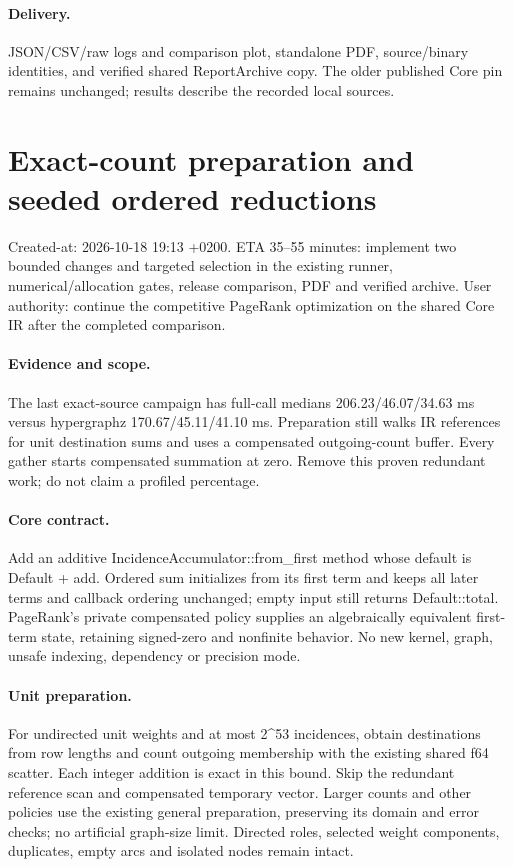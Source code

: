 \documentclass[11pt]{article}
\begin{document}
\paragraph{Delivery.} JSON/CSV/raw logs and comparison plot, standalone PDF,
source/binary identities, and verified shared ReportArchive copy. The older
published Core pin remains unchanged; results describe the recorded local sources.


\newpage\section*{Exact-count preparation and seeded ordered reductions}
Created-at: 2026-10-18 19:13 +0200. ETA 35--55 minutes: implement two bounded changes and targeted
selection in the existing runner, numerical/allocation gates, release comparison,
PDF and verified archive. User authority: continue the competitive PageRank
optimization on the shared Core IR after the completed comparison.
\paragraph{Evidence and scope.} The last exact-source campaign has full-call
medians 206.23/46.07/34.63 ms versus hypergraphz 170.67/45.11/41.10 ms.
Preparation still walks IR references for unit destination sums and uses a
compensated outgoing-count buffer. Every gather starts compensated summation at
zero. Remove this proven redundant work; do not claim a profiled percentage.
\paragraph{Core contract.} Add an additive IncidenceAccumulator::from\_first
method whose default is Default + add. Ordered sum initializes from its first
term and keeps all later terms and callback ordering unchanged; empty input
still returns Default::total. PageRank's private compensated policy supplies an
algebraically equivalent first-term state, retaining signed-zero and nonfinite
behavior. No new kernel, graph, unsafe indexing, dependency or precision mode.
\paragraph{Unit preparation.} For undirected unit weights and at most 2\^{}53
incidences, obtain destinations from row lengths and count outgoing membership
with the existing shared f64 scatter. Each integer addition is exact in this
bound. Skip the redundant reference scan and compensated temporary vector.
Larger counts and other policies use the existing general preparation, preserving
its domain and error checks; no artificial graph-size limit. Directed roles,
selected weight components, duplicates, empty arcs and isolated nodes remain intact.
\end{document}
